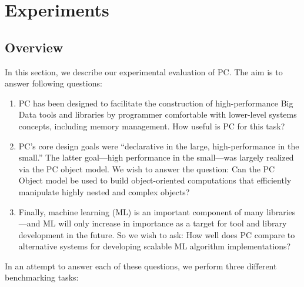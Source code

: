 
\section{Experiments}

\subsection{Overview}

In this section, we describe our experimental evaluation of PC.
The aim is to answer
following questions:

\begin {enumerate}
\item PC has been designed to facilitate the construction of high-performance Big Data tools and libraries by programmer
comfortable with lower-level systems concepts, including memory management.
How useful is PC for this task?
\item PC's core design goals were ``declarative in the large,
high-performance in the small.'' The latter goal---high performance in the small---was largely realized via the 
PC object model.  We wish to answer the question: Can the PC Object model be used to build 
object-oriented computations
that efficiently manipulate highly nested and complex objects?
\item Finally, machine learning (ML) is an important component of many libraries---and ML will only increase in importance
as a target for tool and library development in the future.
So we wish to ask: How well does PC compare to alternative systems for developing scalable ML algorithm implementations?
\end {enumerate}

\noindent In an attempt to answer each of these questions, we perform three different benchmarking tasks:

